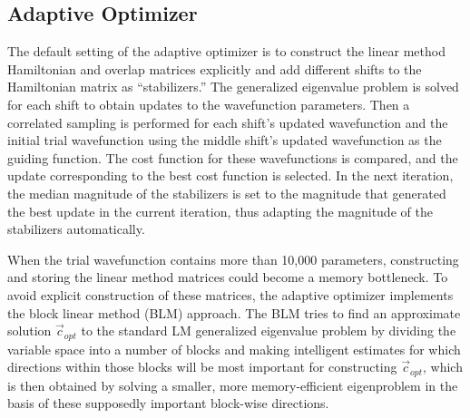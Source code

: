 \subsection{Adaptive Optimizer}

The default setting of the adaptive optimizer is to construct the linear method Hamiltonian and overlap matrices explicitly and add different shifts to the Hamiltonian matrix 
as ``stabilizers.''
The generalized eigenvalue problem is solved for each shift to obtain updates to the wavefunction parameters.
Then a correlated sampling is performed for each shift's updated wavefunction and the initial trial wavefunction
using the middle shift's updated wavefunction as the guiding function.
The cost function for these wavefunctions is compared, and the update corresponding to the best cost function is selected.
In the next iteration, the median magnitude of the stabilizers is set to the magnitude that generated the best update in the current iteration, thus adapting the magnitude of
the stabilizers automatically.

When the trial wavefunction contains more than 10,000 parameters, constructing and storing the linear method matrices could become a memory bottleneck. 
To avoid explicit construction of these matrices, the adaptive optimizer implements the block linear method (BLM) approach. \cite{Zhao:2017:blocked_lm}
The BLM tries to find an approximate 
solution\:  $\vec{c}_{opt}$ to the standard LM generalized eigenvalue problem by dividing the variable space into a number of blocks
and making intelligent estimates for which directions within those blocks will be most important for constructing\:   $\vec{c}_{opt}$, 
which is then obtained by solving a smaller, more memory-efficient 
eigenproblem in the basis of these supposedly important block-wise directions. 

